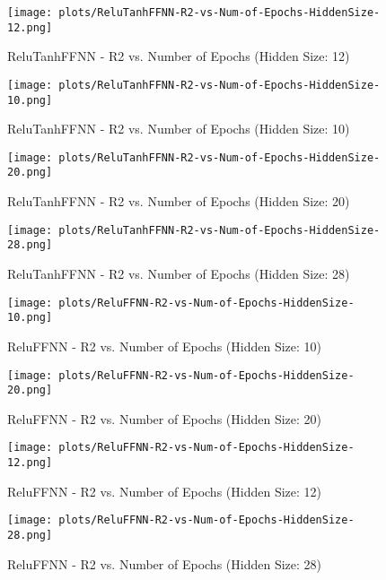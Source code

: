 \begin{figure}[H]
    \centering
    \texttt{[image: plots/ReluTanhFFNN-R2-vs-Num-of-Epochs-HiddenSize-12.png]}
    \caption{ReluTanhFFNN - R2 vs. Number of Epochs (Hidden Size: 12)}
\end{figure}

\begin{figure}[H]
    \centering
    \texttt{[image: plots/ReluTanhFFNN-R2-vs-Num-of-Epochs-HiddenSize-10.png]}
    \caption{ReluTanhFFNN - R2 vs. Number of Epochs (Hidden Size: 10)}
\end{figure}

\begin{figure}[H]
    \centering
    \texttt{[image: plots/ReluTanhFFNN-R2-vs-Num-of-Epochs-HiddenSize-20.png]}
    \caption{ReluTanhFFNN - R2 vs. Number of Epochs (Hidden Size: 20)}
\end{figure}

\begin{figure}[H]
    \centering
    \texttt{[image: plots/ReluTanhFFNN-R2-vs-Num-of-Epochs-HiddenSize-28.png]}
    \caption{ReluTanhFFNN - R2 vs. Number of Epochs (Hidden Size: 28)}
\end{figure}

\begin{figure}[H]
    \centering
    \texttt{[image: plots/ReluFFNN-R2-vs-Num-of-Epochs-HiddenSize-10.png]}
    \caption{ReluFFNN - R2 vs. Number of Epochs (Hidden Size: 10)}
\end{figure}

\begin{figure}[H]
    \centering
    \texttt{[image: plots/ReluFFNN-R2-vs-Num-of-Epochs-HiddenSize-20.png]}
    \caption{ReluFFNN - R2 vs. Number of Epochs (Hidden Size: 20)}
\end{figure}

\begin{figure}[H]
    \centering
    \texttt{[image: plots/ReluFFNN-R2-vs-Num-of-Epochs-HiddenSize-12.png]}
    \caption{ReluFFNN - R2 vs. Number of Epochs (Hidden Size: 12)}
\end{figure}

\begin{figure}[H]
    \centering
    \texttt{[image: plots/ReluFFNN-R2-vs-Num-of-Epochs-HiddenSize-28.png]}
    \caption{ReluFFNN - R2 vs. Number of Epochs (Hidden Size: 28)}
\end{figure}

